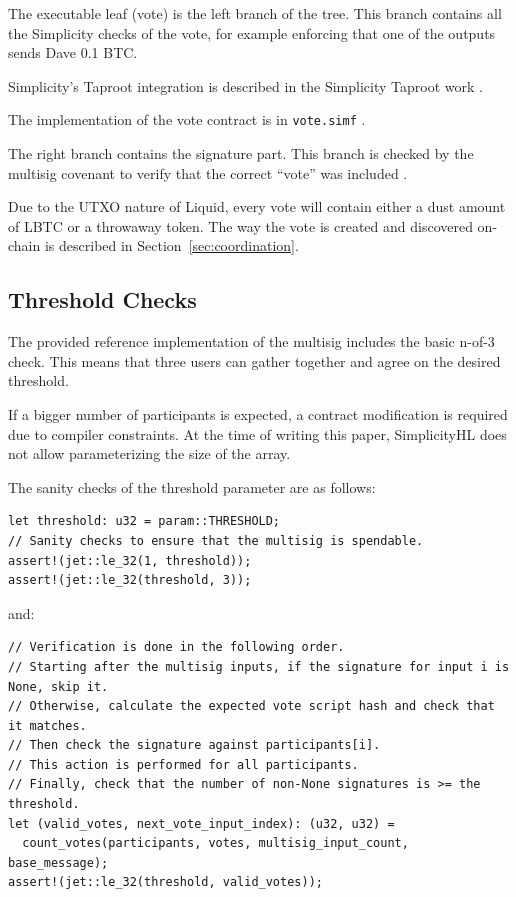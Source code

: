 \documentclass[11pt]{article}
\begin{document}
    The executable leaf (vote) is the left branch of the tree. This branch contains all the Simplicity checks of the vote, for example enforcing that one of the outputs sends Dave 0.1 BTC.

    Simplicity's Taproot integration is described in the Simplicity Taproot work
    \cite{simplicity-taproot-universal-sighashes}.

    The implementation of the vote contract is in \texttt{vote.simf} \cite{native-multisig-vote}.

    The right branch contains the signature part. This branch is checked by the multisig covenant to verify that the correct ``vote'' was included
    \cite{native-multisig-multisig}.

    Due to the UTXO nature of Liquid, every vote will contain either a dust amount of LBTC or a throwaway token. The way the vote is created and discovered on-chain is described in Section~\ref{sec:coordination}.

    \subsection{Threshold Checks}

    The provided reference implementation of the multisig \cite{native-multisig-multisig} includes the basic n-of-3 check. This means that three users can gather together and agree on the desired threshold.

    If a bigger number of participants is expected, a contract modification is required due to compiler constraints. At the time of writing this paper, SimplicityHL does not allow parameterizing the size of the array.

    The sanity checks of the threshold parameter are as follows:

    \begin{lstlisting}
let threshold: u32 = param::THRESHOLD;
// Sanity checks to ensure that the multisig is spendable.
assert!(jet::le_32(1, threshold));
assert!(jet::le_32(threshold, 3));
    \end{lstlisting}

    and:

    \begin{lstlisting}
// Verification is done in the following order.
// Starting after the multisig inputs, if the signature for input i is None, skip it.
// Otherwise, calculate the expected vote script hash and check that it matches.
// Then check the signature against participants[i].
// This action is performed for all participants.
// Finally, check that the number of non-None signatures is >= the threshold.
let (valid_votes, next_vote_input_index): (u32, u32) =
  count_votes(participants, votes, multisig_input_count, base_message);
assert!(jet::le_32(threshold, valid_votes));
    \end{lstlisting}
\end{document}
